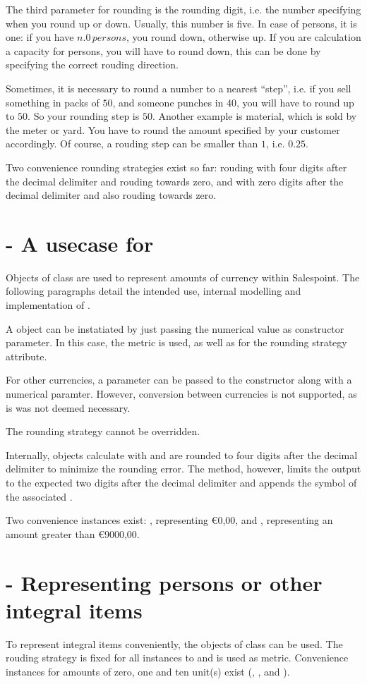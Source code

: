 The third parameter for rounding is the rounding digit, i.e. the number specifying when you round up or down.
Usually, this number is five.
In case of persons, it is one: if you have $n.0\,persons$, you round down, otherwise up.
If you are calculation a capacity for persons, you will have to round down, this can be done by specifying the correct rouding direction.

Sometimes, it is necessary to round a number to a nearest ``step'', i.e. if you sell something in packs of $50$, and someone punches in $40$, you will have to round up to $50$.
So your rounding step is $50$.
Another example is material, which is sold by the meter or yard.
You have to round the amount specified by your customer accordingly.
Of course, a rouding step can be smaller than $1$, i.e. $0.25$.

Two convenience rounding strategies exist so far:  rouding with four digits after the decimal delimiter and rouding towards zero, and  with zero digits after the decimal delimiter and also rouding towards zero.

\section{ - A usecase for }
Objects of class  are used to represent amounts of currency within Salespoint.
The following paragraphs detail the intended use, internal modelling and implementation of .

A  object can be instatiated by just passing the numerical value as constructor parameter.
In this case, the metric  is used, as well as  for the rounding strategy attribute.

For other currencies, a  parameter can be passed to the constructor along with a numerical paramter.
However, conversion between currencies is not supported, as is was not deemed necessary.

The rounding strategy cannot be overridden.

Internally,  objects calculate with and are rounded to four digits after the decimal delimiter to minimize the rounding error.
The  method, however, limits the output to the expected two digits after the decimal delimiter and appends the symbol of the associated .

Two convenience instances exist: , representing \euro{0,00}, and , representing an amount greater than \euro{9000,00}.

\section{ - Representing persons or other integral items}
To represent integral items conveniently, the objects of class  can be used.
The rouding strategy is fixed for all instances to  and  is used as metric.
Convenience instances for amounts of zero, one and ten unit(s) exist (, , and ).
